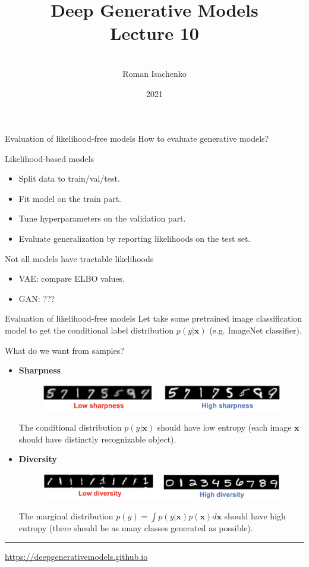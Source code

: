 \documentclass{beamer}
\title[\hbox to 56mm{Deep Generative Models  \hfill\insertframenumber\,/\,\inserttotalframenumber}]
{Deep Generative Models \\ Lecture 10}
\author[Roman Isachenko]{\\Roman Isachenko}
\institute[Ozon]{Ozon Masters \\
}
\date{2021}
\newcommand{\bx}{\mathbf{x}}
\begin{document}
\begin{frame}
\titlepage
\end{frame}
\begin{frame}{Evaluation of likelihood-free models}
	How to evaluate generative models?
	\begin{block}{Likelihood-based models}
		\begin{itemize}
			\item Split data to train/val/test.
			\item Fit model on the train part.
			\item Tune hyperparameters on the validation part.
			\item Evaluate generalization by reporting likelihoods on the test set.
		\end{itemize}
	\end{block}
	\begin{block}{Not all models have tractable likelihoods}
		\begin{itemize}
			\item VAE: compare ELBO values.
			\item GAN: ???
		\end{itemize}
	\end{block}
\end{frame}
\begin{frame}{Evaluation of likelihood-free models}
	Let take some pretrained image classification model to get the conditional label distribution $p(y | \bx)$ (e.g. ImageNet classifier).
	\begin{block}{What do we want from samples?}
		\begin{itemize}
			\item \textbf{Sharpness}
			\begin{figure}
				\centering
				\includegraphics[width=0.9\linewidth]{figs/sharpness}
			\end{figure}
			The conditional distribution $p(y | \bx)$ should have low entropy (each image $\bx$ should have distinctly recognizable object).
			\item \textbf{Diversity}
			\begin{figure}
				\centering
				\includegraphics[width=0.9\linewidth]{figs/diversity}
			\end{figure}
			The marginal distribution $p(y) = \int p(y | \bx) p(\bx) d \bx$ should have high entropy (there should be as many classes generated as possible).
		\end{itemize}
	\end{block}
	\vfill
	\hrule\medskip 
	{\scriptsize \href{https://deepgenerativemodels.github.io}{https://deepgenerativemodels.github.io}}
\end{frame}
\end{document}
